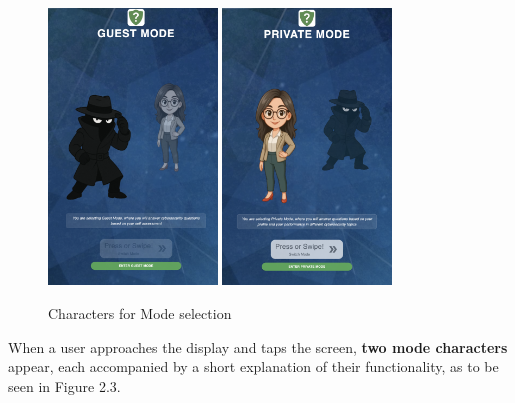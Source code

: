 \begin{figure}[H]
    \centering
    \includegraphics[width=0.4\textwidth]{images/MainScreenCharacter1.png}
    \includegraphics[width=0.4\textwidth]{images/MainScreenCharacter2.png}
    \caption{Characters for Mode selection}
\end{figure}
When a user approaches the display and taps the screen, \textbf{two mode characters} appear, each accompanied 
by a short explanation of their functionality, as to be seen in Figure 2.3.